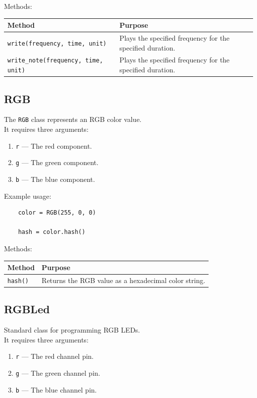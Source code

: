 Methods:

\begin{tabular}{ll}
	\toprule
	\textbf{Method} & \textbf{Purpose}\\
	\midrule
	\texttt{write(frequency, time, unit)} & Plays the specified frequency for the specified duration.\\
	\texttt{write\_note(frequency, time, unit)} & Plays the specified frequency for the specified duration.\\
	\bottomrule
\end{tabular}





\subsection{RGB}

The \texttt{RGB} class represents an RGB color value.\\
It requires three arguments:

\begin{enumerate}
	\item \texttt{r} --- The red component.
	\item \texttt{g} --- The green component.
	\item \texttt{b} --- The blue component.
\end{enumerate}

Example usage:

\begin{lstlisting}
	color = RGB(255, 0, 0)
	
	hash = color.hash()
\end{lstlisting}

Methods:

\begin{tabular}{ll}
	\toprule
	\textbf{Method} & \textbf{Purpose}\\
	\midrule
	\texttt{hash()} & Returns the RGB value as a hexadecimal color string.\\
	\bottomrule
\end{tabular}

\newpage
\subsection{RGBLed}

Standard class for programming RGB LEDs.\\
It requires three arguments:

\begin{enumerate}
	\item \texttt{r} --- The red channel pin.
	\item \texttt{g} --- The green channel pin.
	\item \texttt{b} --- The blue channel pin.
\end{enumerate}

